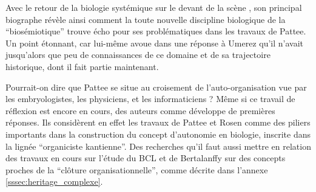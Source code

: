 
Avec le retour de la biologie systémique sur le devant de la scène \autocites{Mossio2014b, Braillard2008}, son principal biographe \textcite{Umerez2009} révèle ainsi comment la toute nouvelle discipline biologique de la \enquote{biosémiotique} trouve écho pour ses problématiques dans les travaux de Pattee. Un point étonnant, car lui-même avoue dans une réponse à Umerez \autocite{Pattee2009} qu'il n'avait jusqu'alors que peu de connaissances de ce domaine et de sa trajectoire historique, dont il fait partie maintenant. 

Pourrait-on dire que Pattee se situe au croisement de l'auto-organisation vue par les embryologistes, les physiciens, et les informaticiens ? Même si ce travail de réflexion est encore en cours, des auteurs comme \textcite{Bergareche2015} développe de premières réponses. Ils considèrent en effet les travaux de Pattee et Rosen comme des piliers importants dans la construction du concept d'autonomie en biologie, inscrite dans la lignée \enquote{organiciste kantienne}. Des recherches qu'il faut aussi mettre en relation des travaux en cours sur l'étude du BCL et de Bertalanffy \autocite{Pouvreau2013} sur des concepts proches de la \enquote{clôture organisationnelle}, comme décrite dans l'annexe \ref{sssec:heritage_complexe}.



%




